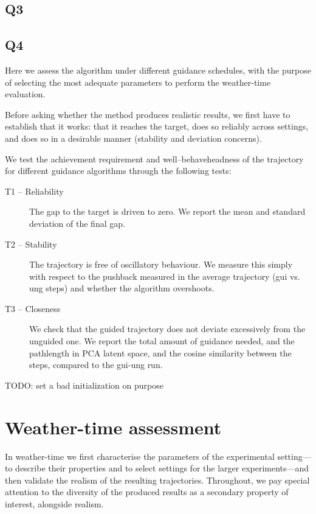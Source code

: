 \subsection{Q3}

\subsection{Q4}

Here we assess the algorithm under different guidance schedules, with the purpose of selecting the most adequate parameters to perform the weather-time evaluation. 

Before asking whether the method produces realistic results, we first have to establish that it works: that it reaches the target, does so reliably across settings, and does so in a desirable manner (stability and deviation concerns).

We test the achievement requirement and well--behaveheadness of the trajectory for different guidance algorithms through the following tests:

\begin{description}
    \item[T1 -- Reliability] The gap to the target is driven to zero. We report the mean and standard deviation of the final gap.
    \item[T2 -- Stability] The trajectory is free of oscillatory behaviour. We measure this simply with respect to the pushback measured in the average trajectory (gui vs. ung steps) and whether the algorithm overshoots.
    \item[T3 -- Closeness] We check that the guided trajectory does not deviate excessively from the unguided one. We report the total amount of guidance needed, and the pathlength in PCA latent space, and the cosine similarity between the steps, compared to the gui-ung run.
\end{description}
TODO: set a bad initialization on purpose

\section{Weather-time assessment}

In weather-time we first characterise the parameters of the experimental setting---to describe their properties and to select settings for the larger experiments---and then validate the realism of the resulting trajectories. 
Throughout, we pay special attention to the diversity of the produced results as a secondary property of interest, alongside realism.


